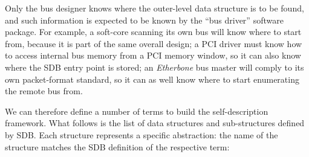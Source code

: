 \documentclass[a4paper, 12pt]{article}
\begin{document}
Only the bus designer knows where the outer-level data structure is to
be found, and such information is expected to be known by the ``bus
driver'' software package.  For example, a soft-core scanning its own
bus will know where to start from, because it is part of the same
overall design; a PCI driver must know how to access internal bus
memory from a PCI memory window, so it can also know where the
SDB entry point is stored; an \textit{Etherbone} bus master will
comply to its own packet-format standard, so it can as well know
where to start enumerating the remote bus from.

We can therefore define a number of terms to build the
self-description framework. What follows is the list of data
structures and sub-structures defined by SDB. Each
structure represents a specific abstraction: the name of the
structure matches the SDB definition of the respective term:
\end{document}
